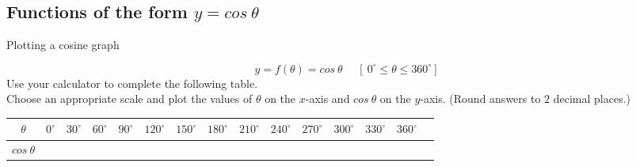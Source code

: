 \subsection*{Functions of the form $y=cos ~\theta$}
\begin{wex}
{Plotting a cosine graph}
{
\begin{equation*}
  y=f(\theta)=cos ~  \theta~~~~~~[~0^{\circ} \leq \theta \leq 360^{\circ}]
\end{equation*}
Use your calculator to complete the following table. \\
Choose an appropriate scale and plot the values of
$\theta$ on the $x$-axis and $cos ~\theta$ on the $y$-axis. (Round
answers to $2$ decimal places.)

\begin{table}[H]
\begin{center}
\begin{tabular}{|c|m{0.3cm}|m{0.3cm}|m{0.3cm}|m{0.5cm}|m{0.5cm}|m{0.5cm}|m{0.5cm}|m{0.5cm}|m{0.5cm}|m{0.5cm}|m{0.5cm}|m{0.5cm}|m{0.5cm}|} \hline

\footnotesize$\theta $&
\footnotesize$0^{\circ }$&
\footnotesize$30^{\circ }$&
\footnotesize$60^{\circ }$&
\footnotesize$90^{\circ }$&
\footnotesize$120^{\circ }$&
\footnotesize$150^{\circ }$&
\footnotesize$180^{\circ }$&
\footnotesize$210^{\circ }$&
\footnotesize$240^{\circ }$&
\footnotesize$270^{\circ }$&
\footnotesize$300^{\circ }$&
\footnotesize$330^{\circ }$&
\footnotesize$360^{\circ }$
\\ \hline

\footnotesize$cos ~\theta $&
&
&
&
&
&
&
&
&
&
&
&
&
&

 \hline
\end{tabular}
\end{center}
\end{table}
}
{
\begin{table}[H]

\begin{center}


\end{center}
\end{table}}
\end{wex}
